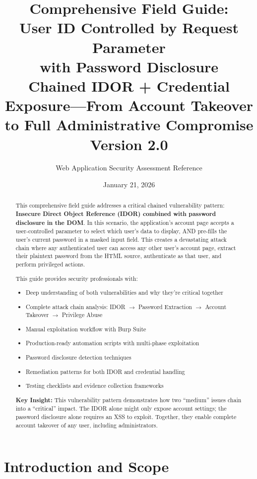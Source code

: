 \documentclass[11pt,letterpaper]{article}
\title{\textbf{Comprehensive Field Guide:\\User ID Controlled by Request Parameter\\with Password Disclosure}\\[0.5em]
\large Chained IDOR + Credential Exposure---From Account Takeover to Full Administrative Compromise\\[0.3em]
\normalsize Version 2.0}
\author{Web Application Security Assessment Reference}
\date{January 21, 2026}
\newcommand{\inlinecode}[1]{\texttt{\detokenize{#1}}}
\begin{document}
\maketitle

\begin{abstract}
\noindent This comprehensive field guide addresses a critical chained vulnerability pattern: \textbf{Insecure Direct Object Reference (IDOR) combined with password disclosure in the DOM}. In this scenario, the application's account page accepts a user-controlled \inlinecode{id} parameter to select which user's data to display, AND pre-fills the user's current password in a masked input field. This creates a devastating attack chain where any authenticated user can access any other user's account page, extract their plaintext password from the HTML source, authenticate as that user, and perform privileged actions.

This guide provides security professionals with:
\begin{itemize}
  \item Deep understanding of both vulnerabilities and why they're critical together
  \item Complete attack chain analysis: IDOR $\rightarrow$ Password Extraction $\rightarrow$ Account Takeover $\rightarrow$ Privilege Abuse
  \item Manual exploitation workflow with Burp Suite
  \item Production-ready automation scripts with multi-phase exploitation
  \item Password disclosure detection techniques
  \item Remediation patterns for both IDOR and credential handling
  \item Testing checklists and evidence collection frameworks
\end{itemize}

\noindent\textbf{Key Insight:} This vulnerability pattern demonstrates how two ``medium'' issues chain into a ``critical'' impact. The IDOR alone might only expose account settings; the password disclosure alone requires an XSS to exploit. Together, they enable complete account takeover of any user, including administrators.
\end{abstract}

\tableofcontents
\newpage

\section{Introduction and Scope}
\end{document}
